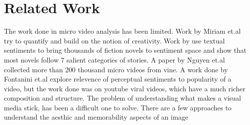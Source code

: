 \section{ Related Work}
The work done in micro video analysis has been limited. Work by Miriam et.al \cite{redi20146} try to quantify and build on the notion of creativity. Work by \cite{reagan2016emotional} use textual sentiments to bring thousands of fiction novels to sentiment space and show that most novels follow 7 salient categories of stories. 
A paper by Nguyen et.al \cite{nguyen2016open} collected more than 200 thousand micro videos from vine. 
A work done by Fontanini et.al \cite{fontanini2016web} explore relevence of perceptual sentiments to popularity of a video, but the work done was on youtube viral videos, which have a much richer composition and structure. 
The problem of understanding what makes a visual media stick, has been a difficult one to solve. There are a few approaches to understand the aesthic and memorability aspects of an image \cite{Isola2011} \cite{datta2008algorithmic} \cite{goodSelfie}
